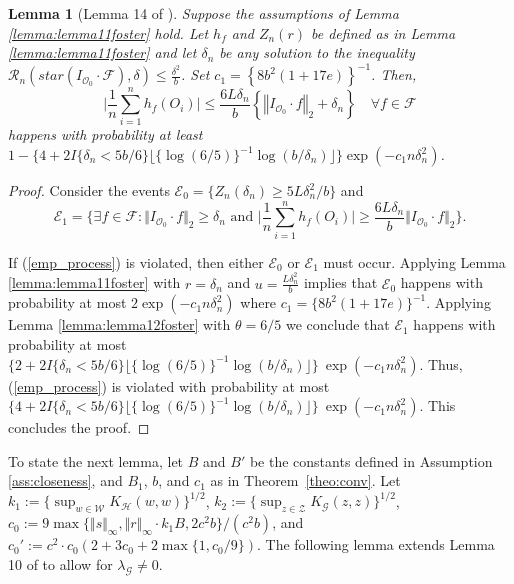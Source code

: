 \documentclass[twoside,11pt]{article}
\newtheorem{lemma}{Lemma}
\newcommand{\mc}{\mathcal}
\begin{document}
\begin{lemma}[Lemma 14 of \cite{foster2023orthogonal}]
Suppose the assumptions of Lemma \ref{lemma:lemma11foster} hold. Let $h_f$ and $Z_n(r) $ be defined as in Lemma \ref{lemma:lemma11foster} and let $\delta_n$ be any solution to the inequality $\mc{R}_n\left(star\left(I_{\mc{O}_0}\cdot\mc{F}\right),\delta\right)\le\frac{\delta^2}{b}$. Set $c_1=\left\{8b^2(1+17e)\right\}^{-1}$. Then, 
\begin{equation}
\big\vert\frac{1}{n}
\sum_{i=1}^n h_f(O_i) \big\vert \le 
\frac{6L\delta_n}{b} \left\{ \left\Vert I_{\mc{O}_0}\cdot f \right\Vert_2 + \delta_n \right\} \quad \forall f\in\mc{F}
\label{emp_process}
\end{equation}
happens with probability at least 
$1-\{4+2I\{\delta_n<5b/6\}\lfloor\{\log(6/5)\}^{-1}\log(b/\delta_n)\rfloor\}\exp(-c_1n\delta_n^2)$.
\label{lemma:lemma14foster}
\end{lemma}

\begin{proof}
    Consider the events $ \mc{E}_0=\{Z_n(\delta_n)\ge5L\delta_n^2/b\}$ and
    \[
     \mc{E}_1=\Big\{\exists f\in\mc{F}:\Vert I_{\mc{O}_0}\cdot f\Vert_2\ge\delta_n\text{ and } \Big\vert\frac{1}{n}
\sum_{i=1}^n h_f(O_i) \Big\vert\ge \frac{6L\delta_n}{b}\Vert I_{\mc{O}_0}\cdot f\Vert_2\Big\}.
    \]

If (\ref{emp_process}) is violated, then either $\mc{E}_0$ or $\mc{E}_1$ must occur. Applying Lemma \ref{lemma:lemma11foster} with $r=\delta_n$ and $u=\frac{L\delta_n^2}{b}$ implies that $\mc{E}_0$ happens with probability at most $2\exp(-c_1n\delta_n^2)$ where $c_1=\{8b^2(1+17e)\}^{-1}$. Applying Lemma \ref{lemma:lemma12foster} with $\theta = 6/5$ we conclude that $\mc{E}_1$ happens with probability at most $\{2+2I\{\delta_n<5b/6\}\lfloor\{\log(6/5)\}^{-1}\log(b/\delta_n)\rfloor\}\:\exp(-c_1n\delta_n^2)$. Thus, (\ref{emp_process}) is violated with probability at most $\{4+2I\{\delta_n<5b/6\}\lfloor\{\log(6/5)\}^{-1}\log(b/\delta_n)\rfloor\}\:\exp(-c_1n\delta_n^2)$. This concludes the proof.
\end{proof}

To state the next lemma, let $B$ and $B'$ be the constants defined in Assumption \ref{ass:closeness}, and $B_1$, $b$, and $ c_1$ as in Theorem~\ref{theo:conv}. Let $k_1:=\{\sup_{w\in\mc{W}}K_{\mc{H}}(w,w)\}^{1/2}$, $k_2:=\{\sup_{z\in\mc{Z}}K_{\mc{G}}(z,z)\}^{1/2}$, $c_0:=9\max\{\Vert s\Vert_\infty,\Vert r\Vert_\infty\cdot k_1B, 2c^2b\}/(c^2 b)$, and $c_0':=c^2\cdot c_0(2+3c_0+2\max\{1,c_0/9\})$. The following lemma extends Lemma 10 of \cite{bennett2023source} to allow for $\lambda_\mc{G}\neq0$.
\end{document}
